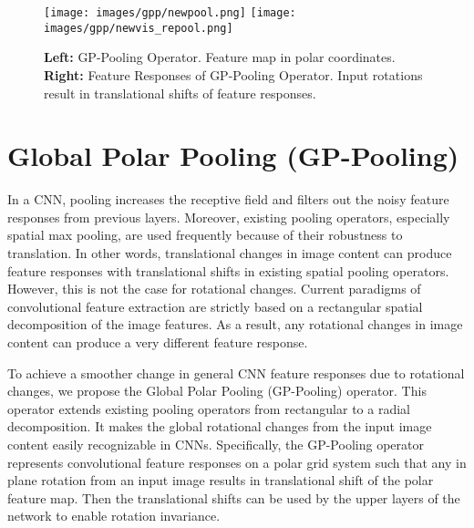\documentclass[10pt,twocolumn,letterpaper]{article}
\begin{document}

\begin{figure}[tb]
    \centering
    \texttt{[image: images/gpp/newpool.png]}
    \texttt{[image: images/gpp/newvis\_repool.png]}

    \caption{\textbf{Left:} GP-Pooling Operator. Feature map in polar coordinates. \textbf{Right:} Feature Responses of GP-Pooling Operator. Input rotations result in translational shifts of feature responses.}
    \label{fig:RE-Pooling}
    \vspace{-0.3cm}
\end{figure}



\section{Global Polar Pooling (GP-Pooling)}

In a CNN, pooling increases the receptive field and filters out the noisy feature responses from previous layers. Moreover, existing pooling operators, especially spatial max pooling, are used frequently because of their robustness to translation. In other words, translational changes in image content can produce feature responses with translational shifts in existing spatial pooling operators. However, this is not the case for rotational changes. Current paradigms of convolutional feature extraction are strictly based on a rectangular spatial decomposition of the image features. As a result, any rotational changes in image content can produce a very different feature response.

To achieve a smoother change in general CNN feature responses due to rotational changes, we propose the Global Polar Pooling (GP-Pooling) operator. This operator extends existing pooling operators from rectangular to a radial decomposition. It makes the global rotational changes from the input image content easily recognizable in CNNs. Specifically, the GP-Pooling operator represents convolutional feature responses on a polar grid system such that any in plane rotation from an input image results in translational shift of the polar feature map. Then the translational shifts can be used by the upper layers of the network to enable rotation invariance. 
\end{document}
